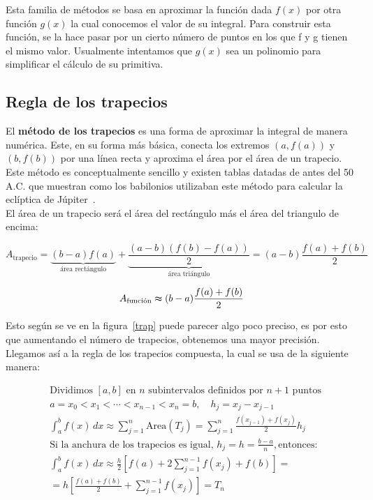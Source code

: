 \documentclass[12pt]{article}
\begin{document}
Esta familia de métodos se basa en aproximar la función dada $f(x)$ por otra función $g(x)$ la cual conocemos el valor de su integral. Para  construir esta función, se la hace pasar por un cierto número de puntos en los que f y g tienen el mismo valor. Usualmente intentamos que $g(x)$ sea un polinomio para simplificar el cálculo de su primitiva.

\subsection{Regla de los trapecios}

El \textbf{método de los trapecios} es una forma de aproximar la integral de manera numérica. Este, en su forma más básica, conecta los extremos $(a,f(a))$ y $(b,f(b))$ por una línea recta y aproxima el área por el área de un trapecio.
Este método es conceptualmente sencillo y existen tablas datadas de antes del 50 A.C. que muestran como los babilonios utilizaban este método para calcular la eclíptica de Júpiter~\citep{Ossendrijver2016}.\\

    
El área de un trapecio será el área del rectángulo más el área del triangulo de encima:
    
\begin{equation*}
A_{\text {trapecio}} = \underbrace{(b-a)f(a)}_{\text{área rectángulo}} + \underbrace{\frac{(a-b)(f(b)-f(a))}{2}}_{\text{área triángulo}} = (a-b)\frac{f(a)+f(b)}{2}
\end{equation*}

\begin{equation}
A_{\text {función}} \thickapprox (b-a)\frac{f(a) + f(b)}{2}
\end{equation}


Esto según se ve en la figura~\ref{trap} puede parecer algo poco preciso, es por esto que aumentando el número de trapecios, obtenemos una mayor precisión. Llegamos así a la regla de los trapecios compuesta, la cual se usa de la siguiente manera:

    \begin{align*}
        &\text{Dividimos } [a,b] \text{ en } n \text{ subintervalos definidos por } n + 1 \text{ puntos} \\
        &a =x_0 < x_1 < \cdots < x_{n-1} < x_n = b , \quad h_j =x_j - x_{j-1} \\
        &\int_{a}^{b} f (x)\,dx \approx \sum_{j=1}^{n} \text{Area}(T_j) =\sum_{j=1}^{n}
          \frac{f (x_{j-1}) + f (x_j)}{2} h_j \\
        &\text{Si la anchura de los trapecios es igual, } h_j = h = \frac{b - a}{n} ,\text{entonces:} \\
        &\int_{a}^{b} f (x)\,dx \approx \frac{h}{2}\left[f(a)+2\sum_{j=1}^{n-1}f(x_j)+f(b)  \right] =\\
        &=h \left[ \frac{f(a)+f(b)}{2} + \sum_{j=1}^{n-1} f (x_j)  \right] = T_n
        \end{align*}
\end{document}
